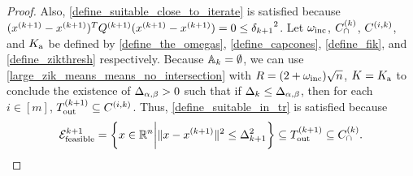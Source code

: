 

\begin{proof}
Also, \cref{define_suitable_close_to_iterate} is satisfied because $({{x}^{(k+1)}} - {{x}^{(k+1)}})^T{Q^{(k+1)}}({{x}^{(k+1)}} - {{x}^{(k+1)}}) = 0 \le {\delta_{k+1}}^2$.
Let $\omega_{\text{inc}}$, ${C^{(k)}_{\cap}}$, ${C^{(i, k)}}$, and ${ K_{\textrm{a}} }$ be defined by \cref{define_the_omegas}, \cref{define_capcones}, \cref{define_fik}, and \cref{define_zikthresh} respectively.
Because ${\mathbb A_{k}} = \emptyset$, we can use 
\cref{large_zik_means_means_no_intersection} with $R = (2 + \omega_{\text{inc}})\sqrt{n}$, $K = { K_{\textrm{a}} }$ to conclude the existence of ${\Delta_{\alpha,\beta}} > 0$ such that 
if $\Delta_k \le {\Delta_{\alpha,\beta}}$, then for each 
$i \in [m]$, ${T_{\text{out}}^{(k+1)}} \subseteq {C^{(i, k)}}$.
Thus, \cref{define_suitable_in_tr} is satisfied because 
\begin{align*}
{\mathcal E^{k+1}_{\textrm{feasible}}} = \left\{x \in \mathbb R^n \bigg| \|x - {{x}^{(k+1)}}\|^2 \le \Delta_{k+1}^2 \right\} \subseteq {T_{\text{out}}^{(k+1)}} \subseteq {C^{(k)}_{\cap}}.
\end{align*}
\end{proof}


